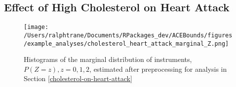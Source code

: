\documentclass[
]{article}
\theoremstyle{plain}
\begin{document}
\hypertarget{effect-of-high-cholesterol-on-heart-attack}{%
\subsection{\texorpdfstring{Effect of High Cholesterol on Heart Attack \label{appendix:cholesterol-on-heart-attack}}{Effect of High Cholesterol on Heart Attack }}\label{effect-of-high-cholesterol-on-heart-attack}}

\begin{figure}[H]
  \center
  \texttt{[image: /Users/ralphtrane/Documents/RPackages\_dev/ACEBounds/figures/example\_analyses/cholesterol\_heart\_attack\_marginal\_Z.png]}
  \caption{Histograms of the marginal distribution of instruments, $P(Z = z), z=0,1,2$, estimated after preprocessing for analysis in Section \ref{cholesterol-on-heart-attack}}
  \label{fig:marginal-distribution-of-instruments-cholesterol-heart-attack}
\end{figure}
\end{document}
